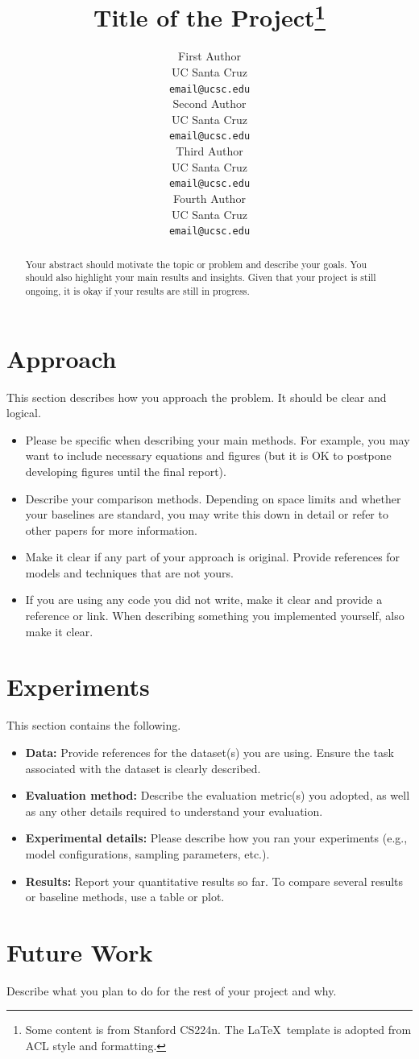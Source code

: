 \documentclass[11pt]{article}
\title{Title of the Project\thanks{\hspace{0.5em}Some content is from Stanford CS224n. The \LaTeX\ template is adopted from ACL style and formatting.}}
\author{First Author \\
  UC Santa Cruz \\
  \texttt{email@ucsc.edu} \\\And
  Second Author \\
  UC Santa Cruz \\
  \texttt{email@ucsc.edu} \\\AND
  Third Author \\
  UC Santa Cruz \\
  \texttt{email@ucsc.edu} \\\And
  Fourth Author \\
  UC Santa Cruz \\
  \texttt{email@ucsc.edu} \\}
\begin{document}
\maketitle

\begin{abstract}
Your abstract should motivate the topic or problem and describe your goals. You should also highlight your main results and insights. Given that your project is still ongoing, it is okay if your results are still in progress. 
\end{abstract}

\section{Approach}
This section describes how you approach the problem. It should be clear and logical.
\begin{itemize}
    \item Please be specific when describing your main methods. For example, you may want to include necessary equations and figures (but it is OK to postpone developing figures until the final report).
    \item Describe your comparison methods. Depending on space limits and whether your baselines are standard, you may write this down in detail or refer to other papers for more information.
    \item Make it clear if any part of your approach is original. Provide references for models and techniques that are not yours.
    \item If you are using any code you did not write, make it clear and provide a reference or link. When describing something you implemented yourself, also make it clear.
\end{itemize}

\section{Experiments}
This section contains the following.
\begin{itemize}
    \item \textbf{Data:} Provide references for the dataset(s) you are using. Ensure the task associated with the dataset is clearly described.
    \item \textbf{Evaluation method:} Describe the evaluation metric(s) you adopted, as well as any other details required to understand your evaluation.
    \item \textbf{Experimental details:} Please describe how you ran your experiments (e.g., model configurations, sampling parameters, etc.).
    \item \textbf{Results:} Report your quantitative results so far. To compare several results or baseline methods, use a table or plot.
\end{itemize}
    
\section{Future Work}
Describe what you plan to do for the rest of your project and why.

\nocite{yao2022react}


\end{document}
